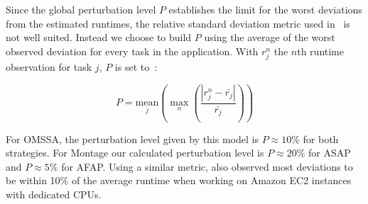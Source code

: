 \documentclass[]{llncs}
\begin{document}
Since the global perturbation level $P$ establishes the limit for the worst
deviations from the estimated runtimes, the relative standard deviation metric
used in~\cite{LeitnerC16} is not well suited. Instead we choose to build $P$
using the average of the worst observed deviation for every task in the
application. With $r_j^n$ the $n$th runtime observation for task $j$, $P$ is set
to~:

\begin{equation}
	P =
	\underset{j}{\textrm{mean}}\left(\max_n\left(\frac{|r_j^n-\bar{r_j}|}
	{\bar{r_j}}\right)\right)
\end{equation}

For OMSSA, the perturbation level given by this model is $P\approx{}10\%$ for both
strategies. For Montage  our calculated perturbation level is  $P\approx{}20\%$
for ASAP and $P\approx{}5\%$ for AFAP. Using a similar metric, \cite{pics} also 
observed most deviations to be within 10\% of the average runtime when working on
Amazon EC2 instances with dedicated CPUs.
\end{document}
